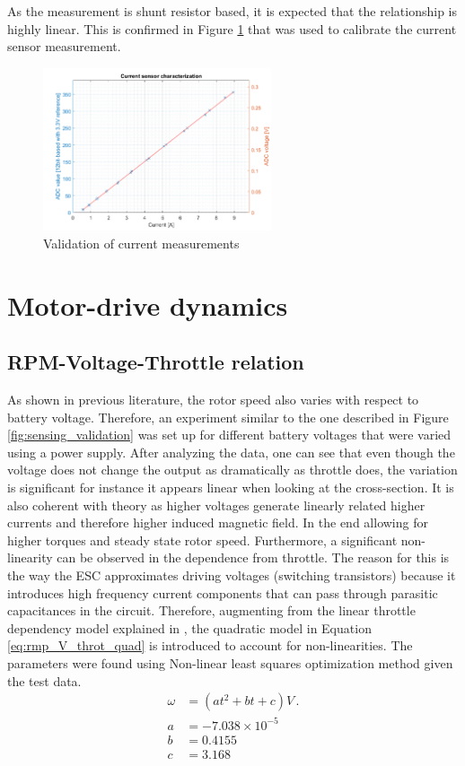 As the measurement is shunt resistor based, it is expected that the relationship is highly linear. This is confirmed in Figure \ref{fig:current_validation} that was used to calibrate the current sensor measurement. 
\begin{figure} 
    \centering
    \includegraphics[width=0.6\textwidth]{images/current_validation.png}
    \caption{Validation of current measurements}
    \label{fig:current_validation}
\end{figure}

\section{Motor-drive dynamics}

\subsection{RPM-Voltage-Throttle relation}
As shown in previous literature, the rotor speed also varies with respect to battery voltage. Therefore, an experiment similar to the one described in Figure \ref{fig:sensing_validation} was set up for different battery voltages that were varied using a power supply. After analyzing the data, one can see that even though the voltage does not change the output as dramatically as throttle does, the variation is significant for instance it appears linear when looking at the cross-section. It is also coherent with theory as higher voltages generate linearly related higher currents and therefore higher induced magnetic field. In the end allowing for higher torques and steady state rotor speed.
Furthermore, a significant non-linearity can be observed in the dependence from throttle. The reason for this is the way the ESC approximates driving voltages (switching transistors) because it introduces high frequency current components that can pass through parasitic capacitances in the circuit. Therefore, augmenting from the linear throttle dependency model explained in \cite{Moutinho2015}, the quadratic model in Equation \ref{eq:rmp_V_throt_quad} is introduced to account for non-linearities. The parameters were found using Non-linear least squares optimization method given the test data.
\begin{equation}
\begin{split}
 \omega &= (at^2 +bt+c)V\, .\\
 a&=-7.038\times 10^{-5}\\
 b&=0.4155\\
 c&=3.168
\end{split} 
\label{eq:rmp_V_throt_quad}   
\end{equation}

